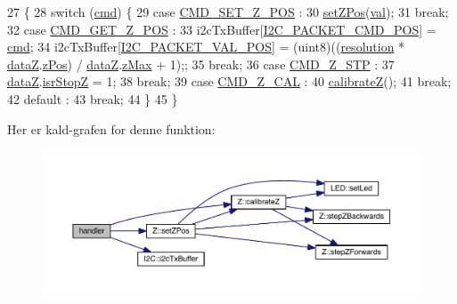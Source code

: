 \begin{DoxyCode}
27 \{
28   \textcolor{keywordflow}{switch} (\hyperlink{queue_8h_a85092d82ab6ea85dad51ba78cbda36a0}{cmd}) \{
29     \textcolor{keywordflow}{case} \hyperlink{handler_8h_a6e695093ea021ccac7cc5d2d788095c9}{CMD\_SET\_Z\_POS} :
30       \hyperlink{z_8h_a32c07d919fae10a36ead3ac6766f7355}{setZPos}(\hyperlink{queue_8h_aa0ccb5ee6d882ee3605ff47745c6467b}{val});
31       \textcolor{keywordflow}{break};
32     \textcolor{keywordflow}{case} \hyperlink{handler_8h_a4d76e78d09a00f75609569d9aa92ab98}{CMD\_GET\_Z\_POS} :
33       i2cTxBuffer[\hyperlink{i2c_8h_ac13fcfeded7dc2d82fa4734456f3761f}{I2C\_PACKET\_CMD\_POS}] = \hyperlink{queue_8h_a85092d82ab6ea85dad51ba78cbda36a0}{cmd};
34       i2cTxBuffer[\hyperlink{i2c_8h_a68506c3651f015716bb2c135e8e7b972}{I2C\_PACKET\_VAL\_POS}] = (uint8)((\hyperlink{z_8h_a518902ce4d6b0c41b04e9fcd3c648916}{resolution} * 
      \hyperlink{data_8h_ace1aa5b973b9358f7236c0c9deca9370}{dataZ}.\hyperlink{data_8h_aafb6592f063176df6830ef1f1e29ae72}{zPos}) / \hyperlink{data_8h_ace1aa5b973b9358f7236c0c9deca9370}{dataZ}.\hyperlink{data_8h_a73591b48f5bcc31997bc92dc465d6696}{zMax} + 1);;
35       \textcolor{keywordflow}{break};
36     \textcolor{keywordflow}{case} \hyperlink{handler_8h_ad119aef78e8cb8e9aa12f35aeae94a99}{CMD\_Z\_STP} :
37       \hyperlink{data_8h_ace1aa5b973b9358f7236c0c9deca9370}{dataZ}.\hyperlink{data_8h_ae55ff8378d0a07b118000a98b273141f}{isrStopZ} = 1;
38       \textcolor{keywordflow}{break};
39     \textcolor{keywordflow}{case} \hyperlink{handler_8h_ab77bdaae57e9e34f7bfc1d1a31213f94}{CMD\_Z\_CAL} :
40       \hyperlink{z_8h_a93a7da079fcd3c801cf2d8a20b812a35}{calibrateZ}();
41       \textcolor{keywordflow}{break};
42     \textcolor{keywordflow}{default} :
43       \textcolor{keywordflow}{break};
44   \}
45 \}
\end{DoxyCode}


Her er kald-\/grafen for denne funktion\+:
\nopagebreak
\begin{figure}[H]
\begin{center}
\leavevmode
\includegraphics[width=350pt]{d2/d01/class_handler_af5be5b016b862943cd22504490acc8f4_cgraph}
\end{center}
\end{figure}




